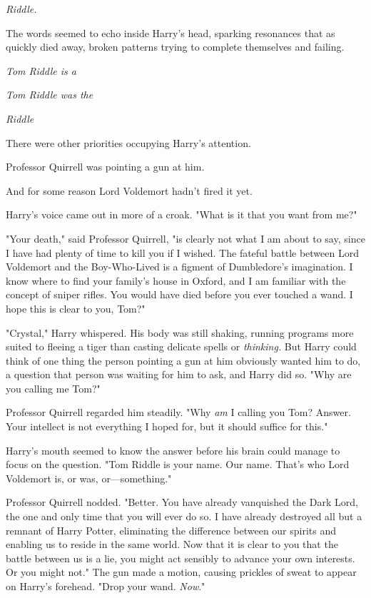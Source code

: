 
 \emph{Riddle.}

\quad\quad
The words seemed to echo inside Harry's head, sparking resonances that as 
quickly died away, broken patterns trying to complete themselves and failing.

\emph{Tom Riddle is a}

\emph{Tom Riddle was the}

\emph{Riddle}

There were other priorities occupying Harry's attention.

Professor Quirrell was pointing a gun at him.

And for some reason Lord Voldemort hadn't fired it yet.

Harry's voice came out in more of a croak. "What is it that you want from me?"

"Your death," said Professor Quirrell, "is clearly not what I am about to say, 
since I have had plenty of time to kill you if I wished. The fateful battle 
between Lord Voldemort and the Boy-Who-Lived is a figment of Dumbledore's 
imagination. I know where to find your family's house in Oxford, and I am 
familiar with the concept of sniper rifles. You would have died before you ever 
touched a wand. I hope this is clear to you, Tom?"

"Crystal," Harry whispered. His body was still shaking, running programs more 
suited to fleeing a tiger than casting delicate spells or \emph{thinking.} But 
Harry could think of one thing the person pointing a gun at him obviously 
wanted him to do, a question that person was waiting for him to ask, and Harry 
did so. "Why are you calling me Tom?"

Professor Quirrell regarded him steadily. "Why \emph{am} I calling you Tom? 
Answer. Your intellect is not everything I hoped for, but it should suffice for 
this."

Harry's mouth seemed to know the answer before his brain could manage to focus 
on the question. "Tom Riddle is your name. Our name. That's who Lord Voldemort 
is, or was, or---something."

Professor Quirrell nodded. "Better. You have already vanquished the Dark Lord, 
the one and only time that you will ever do so. I have already destroyed all 
but a remnant of Harry Potter, eliminating the difference between our spirits 
and enabling us to reside in the same world. Now that it is clear to you that 
the battle between us is a lie, you might act sensibly to advance your own 
interests. Or you might not." The gun made a motion, causing prickles of sweat 
to appear on Harry's forehead. "Drop your wand. \emph{Now}."

